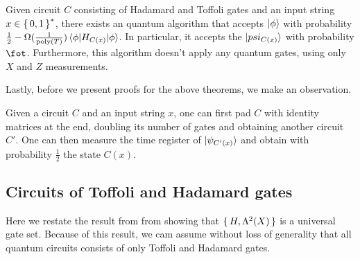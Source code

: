 \iffalse
\begin{definition}
	We call the first registers of $\ket{\psi_{C(x)}}$ the data register, and the later registers of $\psi_{C(x)}$ the time register.
\end{definition}


\begin{thm}
	Given a circuit $C$ consisting of Hadamard and Toffoli gates and an input string $x$, there exists a $\BPP$ machine that can construct a description of $H_{C(x)}$ in polynomial time.
\end{thm}
\fi


\begin{thm}
	Given circuit $C$ consisting of Hadamard and Toffoli gates and an input string $x\in\set{0,1}^*$, there exists an quantum algorithm that accepts $\ket{\phi}$ with probability $\frac{1}{2}-\Omega(\frac{1}{\operatorname*{\operatorname{poly}}(T)})\braket{\phi|H_{C(x)}|\phi}$. In particular, it accepts the $\ket{psi_{C(x)}}$ with probability $\fot$. Furthermore, this algorithm doesn't apply any quantum gates, using only $X$ and $Z$ measurements.
\end{thm}

Lastly, before we present proofs for the above theorems, we make an observation.

\begin{observation}
	\label{idpadding}
	Given a circuit $C$ and an input string $x$, one can first pad $C$ with identity matrices at the end, doubling its number of gates and obtaining another circuit $C'$. One can then measure the time register of $\ket{\psi_{C'(x)}}$ and obtain with probability $\frac{1}{2}$ the state $C(x)$.
\end{observation}

\subsection{Circuits of Toffoli and Hadamard gates}

 Here we restate the result from from \cite{quant-ph/0301040} showing that $\set{H, \Lambda^2(X)}$ is a universal gate set. Because of this result, we cam assume without loss of generality that all quantum circuits consists of only Toffoli and Hadamard gates.
 

